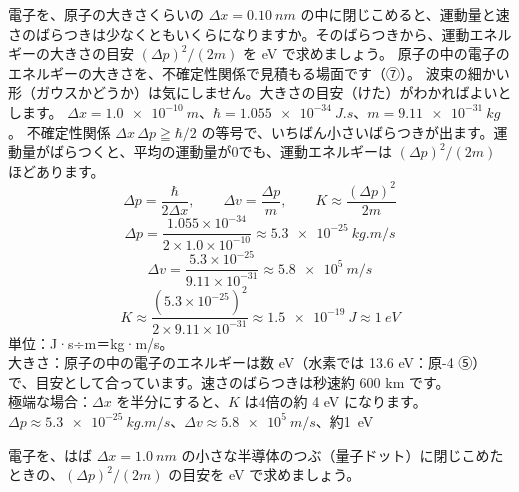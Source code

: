 \label{ph:原-3:ex7}
\begin{phreidai}[原子に閉じこめた電子のエネルギー]
電子を、原子の大きさくらいの $\Delta x=\qty{0.10}{nm}$ の中に閉じこめると、運動量と速さのばらつきは少なくともいくらになりますか。そのばらつきから、運動エネルギーの大きさの目安 $(\Delta p)^2/(2m)$ を eV で求めましょう。
\phbamen
原子の中の電子のエネルギーの大きさを、不確定性関係で見積もる場面です（⑦）。
\phmushi
波束の細かい形（ガウスかどうか）は気にしません。大きさの目安（けた）がわかればよいとします。
\phzu
$\Delta x=\qty{1.0e-10}{m}$、$\hbar=\qty{1.055e-34}{J.s}$、$m=\qty{9.11e-31}{kg}$。
\phriyu
不確定性関係 $\Delta x\,\Delta p\geqq\hbar/2$ の等号で、いちばん小さいばらつきが出ます。運動量がばらつくと、平均の運動量が0でも、運動エネルギーは $(\Delta p)^2/(2m)$ ほどあります。
\phtateru
\[ \Delta p=\frac{\hbar}{2\Delta x},\qquad\Delta v=\frac{\Delta p}{m},\qquad K\approx\frac{(\Delta p)^2}{2m} \]
\phtoku
\[ \Delta p=\frac{1.055\times10^{-34}}{2\times1.0\times10^{-10}}\approx\qty{5.3e-25}{kg.m/s} \]
\[ \Delta v=\frac{5.3\times10^{-25}}{9.11\times10^{-31}}\approx\qty{5.8e5}{m/s} \]
\[ K\approx\frac{(5.3\times10^{-25})^2}{2\times9.11\times10^{-31}}\approx\qty{1.5e-19}{J}\approx\qty{1}{eV} \]
\phtashikame
単位：J·s÷m＝kg·m/s。\\
大きさ：原子の中の電子のエネルギーは数 eV（水素では 13.6 eV：原-4 ⑤）で、目安として合っています。速さのばらつきは秒速約 600 km です。\\
極端な場合：$\Delta x$ を半分にすると、$K$ は4倍の約 4 eV になります。
\kotae $\Delta p\approx\qty{5.3e-25}{kg.m/s}$、$\Delta v\approx\qty{5.8e5}{m/s}$、約\qty{1}{eV}
\end{phreidai}
\begin{jibun}
電子を、はば $\Delta x=\qty{1.0}{nm}$ の小さな半導体のつぶ（量子ドット）に閉じこめたときの、$(\Delta p)^2/(2m)$ の目安を eV で求めましょう。
\end{jibun}

